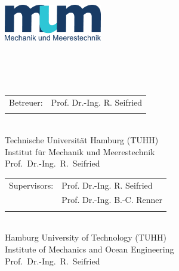 \begin{titlepage}
\begin{minipage}{0.3\linewidth}
	 	 
\end{minipage}\hfill
\begin{minipage}{0.3\linewidth}
	\includegraphics[height=45pt]{Styles/mum_logo.pdf}
\end{minipage}
\vspace{8mm}
\begin{center}
	\vspace{10mm}
    {\ThemaDerArbeit}
	{\ThemaArbeitZweitSprache}
	\vspace{10mm}
	{\hspace{20mm}{\normalsize von}\large\\
	}{}
	{\hspace{20mm}{\normalsize by}\large\\
	}{}
	\hspace{20mm}{\large \VornameDesStudenten \ \NachnameDesStudenten}\\
	\vspace{15mm}
	\normalsize
	{	\hspace{20mm}\begin{tabular}{rl}
			Betreuer: & Prof. Dr.-Ing. R. Seifried \\
			& \Betreuer
		\end{tabular}\\
			\vfill
			\large
			\hspace{20mm}Technische Universität Hamburg (TUHH) \\
			\hspace{20mm}Institut für Mechanik und Meerestechnik\\
			\hspace{20mm}Prof.\ Dr.-Ing.\ R.\ Seifried
		}{}
	{	\hspace{20mm}\begin{tabular}{rl}
			Supervisors: & Prof. Dr.-Ing. R. Seifried \\
			& Prof. Dr.-Ing. B.-C. Renner \\
			& \Betreuer
		\end{tabular}\\
			\vfill
			\large
			\hspace{20mm}Hamburg University of Technology (TUHH) \\
			\hspace{20mm}Institute of Mechanics and Ocean Engineering\\
			\hspace{20mm}Prof.\ Dr.-Ing.\ R.\ Seifried
		}{}


\end{center}
\end{titlepage}
